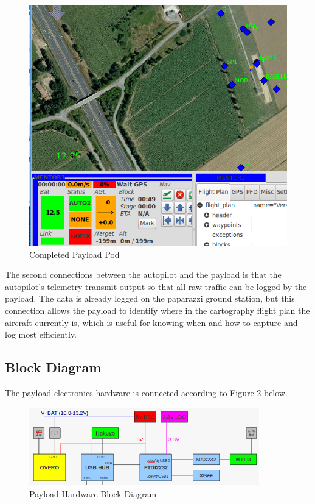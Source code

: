 \documentclass[a4paper,11pt]{report}
\begin{document}
\begin{figure}[ht]
 \centering
 \includegraphics[width=12cm]{papget.png}
 \caption{Completed Payload Pod}
 \label{fig:papget}
\end{figure}

The second connections between the autopilot and the payload is that the autopilot's telemetry transmit output so that all raw traffic can be logged by the payload. The data is already logged on the paparazzi ground station, but this connection allows the payload to identify where in the cartography flight plan the aircraft currently is, which is useful for knowing when and how to capture and log most efficiently.

\subsection{Block Diagram}

The payload electronics hardware is connected according to Figure \ref{fig:hwdiagram} below.

\begin{figure}[ht]
 \centering
 \includegraphics[width=10cm]{payload_hardware_block_diagram.png}
 \caption{Payload Hardware Block Diagram}
 \label{fig:hwdiagram}
\end{figure}
\end{document}
